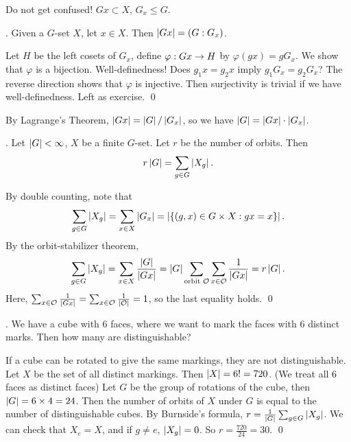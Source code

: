 \rmk Do not get confused! \(Gx \subset X\), \(G_x \leq G\).

\thm.  Given a \(G\)-set \(X\), let \(x \in X\). Then \(\left| Gx \right| = \left(G : G_x\right)\).

\pf Let \(H\) be the left cosets of \(G_x\), define \(\varphi: Gx \rightarrow H\) by \(\varphi(gx) = gG_x\). We show that \(\varphi\) is a bijection. Well-definedness! Does \(g_1x = g_2x\) imply \(g_1 G_x = g_2 G_x\)? The reverse direction shows that \(\varphi\) is injective. Then surjectivity is trivial if we have well-definedness. Left as exercise. \qed

By Lagrange's Theorem, \(\left| Gx \right| = \left| G \right| / \left| G_x \right|\), so we have \(\left| G \right| = \left| Gx \right| \cdot \left| G_x \right|\).

\pagebreak


\thm.  Let \(\left| G \right| < \infty\), \(X\) be a finite \(G\)-set. Let \(r\) be the number of orbits. Then
\[
    r \left| G \right| = \sum_{g\in G} \left| X_g \right|.
\]

\pf By double counting, note that
\[
    \sum_{g \in G} \left| X_g \right| = \sum_{x \in X} \left| G_x \right| = \left| \{ (g, x) \in G\times X : gx = x\} \right|.
\]
By the orbit-stabilizer theorem,
\[
    \sum_{g \in G} \left| X_g \right| = \sum_{x \in X} \frac{\left| G \right|}{\left| G x \right|} = \left| G \right| \sum_{\text{orbit } \mathcal{O}}\sum_{x \in \mathcal{O}} \frac{1}{\left| Gx \right|} = r \left| G \right|.
\]
Here, \(\sum_{x \in \mathcal{O}} \frac{1}{\left| Gx \right|} = \sum_{x \in \mathcal{O}} \frac{1}{\left| \mathcal{O} \right|} = 1\), so the last equality holds. \qed

\ex. We have a cube with 6 faces, where we want to mark the faces with 6 distinct marks. Then how many are distinguishable?

\pf If a cube can be rotated to give the same markings, they are not distinguishable. Let \(X\) be the set of all distinct markings. Then \(\left| X \right| = 6! = 720\). (We treat all 6 faces as distinct faces) Let \(G\) be the group of rotations of the cube, then \(\left| G \right| = 6 \times 4 = 24\). Then the number of orbits of \(X\) under \(G\) is equal to the number of distinguishable cubes. By Burnside's formula, \(r =\frac{1}{\left| G \right|}\sum_{g \in G} \left| X_g \right|\). We can check that \(X_e = X\), and if \(g\neq e\), \(\left| X_g \right| = 0\). So \(r = \frac{720}{24} = 30\). \qed

\pagebreak
